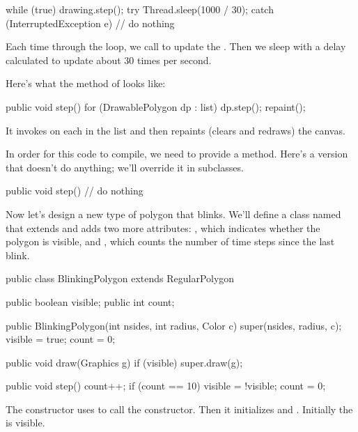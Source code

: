 \begin{code}
while (true) {
    drawing.step();
    try {
        Thread.sleep(1000 / 30);
    } catch (InterruptedException e) {
        // do nothing
    }
}
\end{code}

Each time through the loop, we call  to update the .
Then we sleep with a delay calculated to update about 30 times per second.

Here's what the  method of  looks like:

\begin{code}
public void step() {
    for (DrawablePolygon dp : list) {
        dp.step();
    }
    repaint();
}
\end{code}

It invokes  on each  in the list and then repaints (clears and redraws) the canvas.

In order for this code to compile, we need  to provide a  method.
Here's a version that doesn't do anything; we'll override it in subclasses.

\begin{code}
public void step() {
    // do nothing
}
\end{code}

Now let's design a new type of polygon that blinks.
We'll define a class named  that extends  and adds two more attributes: , which indicates whether the polygon is visible, and , which counts the number of time steps since the last blink.

\begin{code}
public class BlinkingPolygon extends RegularPolygon {
    public boolean visible;
    public int count;

    public BlinkingPolygon(int nsides, int radius, Color c) {
        super(nsides, radius, c);
        visible = true;
        count = 0;
    }

    public void draw(Graphics g) {
        if (visible) {
            super.draw(g);
        }
    }

    public void step() {
        count++;
        if (count == 10) {
            visible = !visible;
            count = 0;
        }
    }
}
\end{code}

The constructor uses  to call the  constructor.
Then it initializes  and .
Initially the  is visible.

